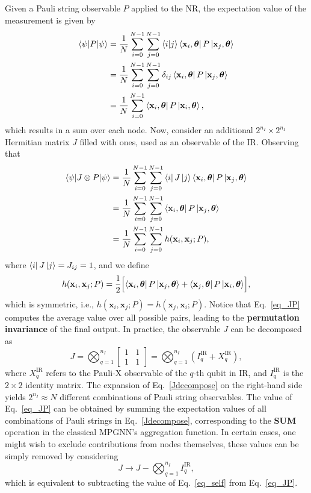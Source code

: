 \documentclass[reprint,amsmath,amssymb,prd,nofootinbib]{revtex4-2}
\def\xbf{\mathbf{x}}
\def\thetabf{\boldsymbol{\theta}}
\def\IIR{I^\text{IR}}
\def\XIR{X^\text{IR}}
\def\I22{\left[\begin{matrix}1 & 1\\ 1 & 1\end{matrix}\right]}
\begin{document}
Given a Pauli string observable $P$ applied to the NR, the expectation value of the measurement is given by
\begin{equation} \label{eq_self}
    \begin{split}
        \braket{\psi|P|\psi}&=\frac{1}{N}\sum^{N-1}_{i=0}\sum^{N-1}_{j=0}\braket{i|j}\bra{\xbf_i, \thetabf}P\ket{\xbf_j, \thetabf}\\
        &=\frac{1}{N}\sum^{N-1}_{i=0}\sum^{N-1}_{j=0}\delta_{ij}\bra{\xbf_i, \thetabf}P\ket{\xbf_j, \thetabf}\\
        &=\frac{1}{N}\sum^{N-1}_{i=0}\bra{\xbf_i, \thetabf}P\ket{\xbf_i, \thetabf},
    \end{split}
\end{equation}
which results in a sum over each node. Now, consider an additional $2^{n_I}\times2^{n_I}$ Hermitian matrix $J$ filled with ones, used as an observable of the IR. Observing that
\begin{equation}\label{eq_JP}
    \begin{split}
        \braket{\psi|J\otimes P|\psi} &= \frac{1}{N}\sum^{N-1}_{i=0}\sum^{N-1}_{j=0}\bra{i}J\ket{j}\bra{\xbf_i, \thetabf}P\ket{\xbf_j, \thetabf} \\
        &= \frac{1}{N}\sum^{N-1}_{i=0}\sum^{N-1}_{j=0}\bra{\xbf_i, \thetabf}P\ket{\xbf_j, \thetabf} \\
        &= \frac{1}{N}\sum^{N-1}_{i=0}\sum^{N-1}_{j=0} h(\xbf_i, \xbf_j; P),
    \end{split}
\end{equation}
where $\bra{i}J\ket{j}=J_{ij}=1$, and we define
\begin{equation*}
    h(\xbf_i, \xbf_j; P) = \frac{1}{2} \Bigl[ \bra{\xbf_i, \thetabf}P\ket{\xbf_j, \thetabf} + \bra{\xbf_j, \thetabf}P\ket{\xbf_i, \thetabf} \Bigr],   
\end{equation*}
which is symmetric, i.e., $h(\xbf_i, \xbf_j; P)=h(\xbf_j, \xbf_i; P)$. Notice that Eq.~\ref{eq_JP} computes the average value over all possible pairs, leading to the \textbf{permutation invariance} of the final output. In practice, the observable $J$ can be decomposed as
\begin{equation}\label{Jdecompose}
    J=\bigotimes^{n_I}_{q=1}\I22=\bigotimes^{n_I}_{q=1}(\IIR_q+\XIR_q),
\end{equation}
where $\XIR_q$ refers to the Pauli-X observable of the $q$-th qubit in IR, and $\IIR_q$ is the $2 \times 2$ identity matrix. The expansion of Eq.~\ref{Jdecompose} on the right-hand side yields $2^{n_I}\approx N$ different combinations of Pauli string observables. The value of Eq.~\ref{eq_JP} can be obtained by summing the expectation values of all combinations of Pauli strings in Eq.~\ref{Jdecompose}, corresponding to the \textbf{SUM} operation in the classical MPGNN's aggregation function. In certain cases, one might wish to exclude contributions from nodes themselves, these values can be simply removed by considering
\begin{equation*}
    J\longrightarrow J-\bigotimes^{n_I}_{q=1}\IIR_q, 
\end{equation*} 
which is equivalent to subtracting the value of Eq.~\ref{eq_self} from Eq.~\ref{eq_JP}.
\end{document}
